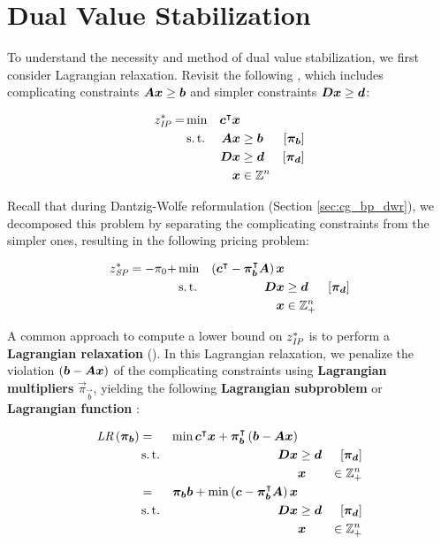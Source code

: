 \section{Dual Value Stabilization}\label{sec:cg_bp_dvs}
To understand the necessity and method of dual value stabilization, we first consider Lagrangian relaxation. Revisit the following \IP{}, which includes complicating constraints ${\bm{A}} {\bm{x}} \geq {\bm{b}}$ and simpler constraints ${\bm{D}} {\bm{x}} \geq {\bm{d}}$:

\begin{equation*}
\begin{aligned}
z^*_{\textit{IP}}{} = &\min & {\bm{c}}^\intercal {\bm{x}} & & & \\
&\operatorname{s.t.} & {\bm{A}} {\bm{x}} & \geq {\bm{b}} & \left[{\bm{\pi}}_{\bm{b}}\right] & \\
&& {\bm{D}} {\bm{x}} & \geq {\bm{d}} & \left[{\bm{\pi}}_{\bm{d}}\right] & \\
&& {\bm{x}} & \in \mathbb{Z}^n
\end{aligned}
\end{equation*}

Recall that during Dantzig-Wolfe reformulation (Section \ref{sec:cg_bp_dwr}), we decomposed this problem by separating the complicating constraints from the simpler ones, resulting in the following pricing problem:

\begin{equation*}
\begin{aligned}
z^*_\SP{} = -\pi_0 + &\min & \left( \vec{c}\transpose - \vec{\pi}_\vec{b}\transpose \mat{A} \right) \vec{x} & & \\
&\st & \mat{D} \vec{x} & \geq \vec{d} & \left[\vec{\pi}_\vec{d}\right] \\
&& \vec{x} & \in \mathbb{Z}_+^n
\end{aligned}
\end{equation*}

A common approach to compute a lower bound on $z^*_{\textit{IP}}{}$ is to perform a \textbf{Lagrangian relaxation} (\LR{}). In this Lagrangian relaxation, we penalize the violation $({\bm{b}} - {\bm{A}} {\bm{x}})$ of the complicating constraints using \textbf{Lagrangian multipliers} $\vec{\pi}_\vec{b}$, yielding the following \textbf{Lagrangian subproblem} or \textbf{Lagrangian function} \cite{thebook}:

\begin{equation*}
\begin{aligned}
\LR{\vec{\pi}_\vec{b}} &= & \min \vec{c}\transpose \vec{x} + \vec{\pi}_\vec{b}\transpose \left( \vec{b} - \mat{A}\vec{x} \right) & & \\
& \st & \mat{D} \vec{x} & \geq \vec{d} & \left[\vec{\pi}_\vec{d}\right] \\
&&& \vec{x} & \in \mathbb{Z}_+^n \\
&= & \vec{\pi}_\vec{b} \vec{b} + \min \left( \vec{c} - \vec{\pi}_\vec{b}\transpose \mat{A} \right) \vec{x} & & \\
& \st & \mat{D} \vec{x} & \geq \vec{d} & \left[\vec{\pi}_\vec{d}\right] \\
&&& \vec{x} & \in \mathbb{Z}_+^n
\end{aligned}
\end{equation*}

